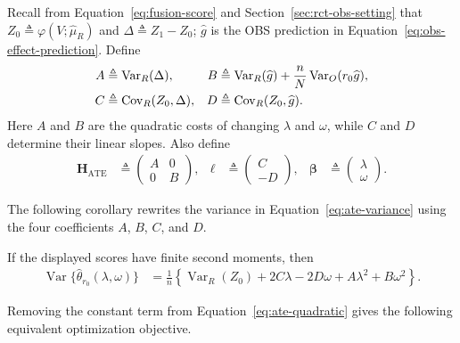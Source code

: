 \begin{definition}
\label{def:ate-variance-objects}
Recall from Equation~\eqref{eq:fusion-score} and
Section~\ref{sec:rct-obs-setting} that
$Z_0\triangleq\varphi(V;\widehat\mu_R)$ and $\Delta\triangleq Z_1-Z_0$;
$\widehat{g}$ is the OBS prediction in
Equation~\eqref{eq:obs-effect-prediction}. Define
	\begin{align}
		A&\triangleq\operatorname{Var}_R(\Delta),
		&
		B&\triangleq\operatorname{Var}_R(\widehat{g})+\frac nN\operatorname{Var}_O(r_0\widehat{g}),
		\notag\\
		C&\triangleq\operatorname{Cov}_R(Z_0,\Delta),
		&
		D&\triangleq\operatorname{Cov}_R(Z_0,\widehat{g}).
	\label{eq:ate-moments}
	\end{align}
	Here $A$ and $B$ are the quadratic costs of changing $\lambda$ and
	$\omega$, while $C$ and $D$ determine their linear slopes.
Also define
\begin{align*}
	\mathbf H_{\mathrm{ATE}}
	&\triangleq
	\begin{pmatrix}A&0\\0&B\end{pmatrix},
	&
	\boldsymbol\ell
	&\triangleq
	\begin{pmatrix}C\\-D\end{pmatrix},
	&
	\boldsymbol\beta
	&\triangleq
	\begin{pmatrix}\lambda\\\omega\end{pmatrix}.
\end{align*}
\end{definition}

The following corollary rewrites the variance in Equation~\eqref{eq:ate-variance} using the four coefficients $A$, $B$, $C$, and $D$.

\renewcommand*{\theHtheoremcorollary}{\theHtheorem.\arabic{theoremcorollary}}
\begin{theoremcorollary}
\label{prop:ate-variance-quadratic}
If the displayed scores have finite second moments, then
\begin{align}
	\operatorname{Var}\{\widehat\theta_{r_0}(\lambda,\omega)\}
	&=
	\frac1n\left\{
	\operatorname{Var}_R(Z_0)+2C\lambda-2D\omega
	+A\lambda^2+B\omega^2
	\right\}.
	\label{eq:ate-quadratic}
\end{align}
\end{theoremcorollary}

Removing the constant term from Equation~\eqref{eq:ate-quadratic} gives the following equivalent optimization objective.

